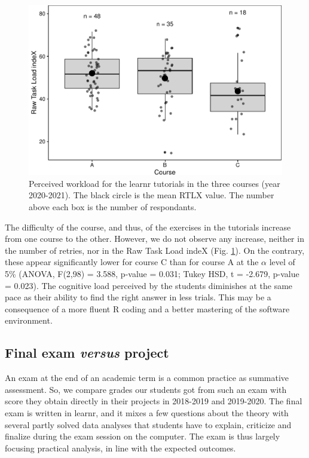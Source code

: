 \documentclass{aims}
\theoremstyle{definition}
\begin{document}
\begin{figure}
\includegraphics[width=1\linewidth]{teaching_data_science_files/figure-latex/fig_rtlx-1} \caption{\label{fig:fig_rtlx} Perceived workload for the learnr tutorials in the three courses (year 2020-2021). The black circle is the mean RTLX value. The number above each box is the number of respondants.}\label{fig:fig_rtlx}
\end{figure}

The difficulty of the course, and thus, of the exercises in the
tutorials increase from one course to the other. However, we do not
observe any increase, neither in the number of retries, nor in the Raw
Task Load indeX (Fig. \ref {fig:fig_rtlx}). On the contrary, these
appear significantly lower for course C than for course A at the
\(\alpha\) level of 5\% (ANOVA, F(2,98) = 3.588, p-value = 0.031; Tukey
HSD, t = -2.679, p-value = 0.023). The cognitive load perceived by the
students diminishes at the same pace as their ability to find the right
answer in less trials. This may be a consequence of a more fluent R
coding and a better mastering of the software environment.

\hypertarget{final-exam-versus-project}{%
\subsection{\texorpdfstring{Final exam \emph{versus}
project}{Final exam versus project}}\label{final-exam-versus-project}}

An exam at the end of an academic term is a common practice as summative
assessment. So, we compare grades our students got from such an exam
with score they obtain directly in their projects in 2018-2019 and
2019-2020. The final exam is written in learnr, and it mixes a few
questions about the theory with several partly solved data analyses that
students have to explain, criticize and finalize during the exam session
on the computer. The exam is thus largely focusing practical analysis,
in line with the expected outcomes.
\end{document}
